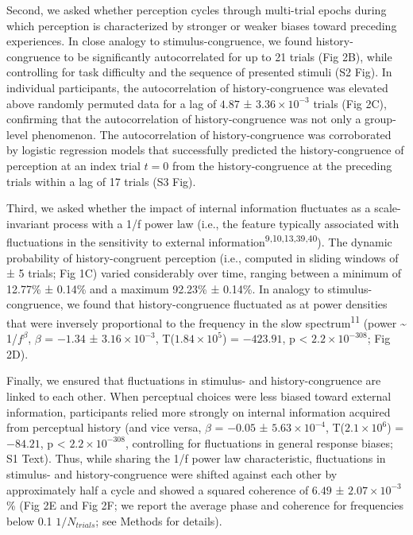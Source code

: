 \documentclass[
]{article}
\begin{document}
Second, we asked whether perception cycles through multi-trial epochs
during which perception is characterized by stronger or weaker biases
toward preceding experiences. In close analogy to stimulus-congruence,
we found history-congruence to be significantly autocorrelated for up to
21 trials (Fig 2B), while controlling for task difficulty and the
sequence of presented stimuli (S2 Fig). In individual
participants, the autocorrelation of history-congruence was elevated
above randomly permuted data for a lag of \(4.87\) ±
\(\ensuremath{3.36\times 10^{-3}}\) trials (Fig 2C), confirming that
the autocorrelation of history-congruence was not only a group-level
phenomenon. The autocorrelation of history-congruence was corroborated
by logistic regression models that successfully predicted the
history-congruence of perception at an index trial \(t = 0\) from the
history-congruence at the preceding trials within a lag of 17 trials
(S3 Fig).

Third, we asked whether the impact of internal information fluctuates as
a scale-invariant process with a 1/f power law (i.e., the feature
typically associated with fluctuations in the sensitivity to external
information\textsuperscript{9,10,13,39,40}). The dynamic probability of
history-congruent perception (i.e., computed in sliding windows of ± 5
trials; Fig 1C) varied considerably over time, ranging between a
minimum of 12.77\% ± 0.14\% and a maximum 92.23\% ± 0.14\%. In analogy
to stimulus-congruence, we found that history-congruence fluctuated as
at power densities that were inversely proportional to the frequency in
the slow spectrum\textsuperscript{11} (power \textasciitilde{}
1/\(f^\beta\), \(\beta\) = \(-1.34\) ±
\(\ensuremath{3.16\times 10^{-3}}\),
T(\(\ensuremath{1.84\times 10^{5}}\)) = \(-423.91\), p < \(\ensuremath{2.2\times 10^{-308}}\); Fig
2D).

Finally, we ensured that fluctuations in stimulus- and
history-congruence are linked to each other. When perceptual choices
were less biased toward external information, participants relied more
strongly on internal information acquired from perceptual history (and
vice versa, \(\beta\) = \(-0.05\) ± \(\ensuremath{5.63\times 10^{-4}}\),
T(\(\ensuremath{2.1\times 10^{6}}\)) = \(-84.21\), p < \(\ensuremath{2.2\times 10^{-308}}\),
controlling for fluctuations in general response biases; S1 Text). Thus, while sharing the 1/f power law characteristic,
fluctuations in stimulus- and history-congruence were shifted against
each other by approximately half a cycle and showed a squared coherence
of \(6.49\) ± \(\ensuremath{2.07\times 10^{-3}}\)\% (Fig 2E and Fig 2F; we
report the average phase and coherence for frequencies below 0.1
\(1/N_{trials}\); see Methods for details).
\end{document}
